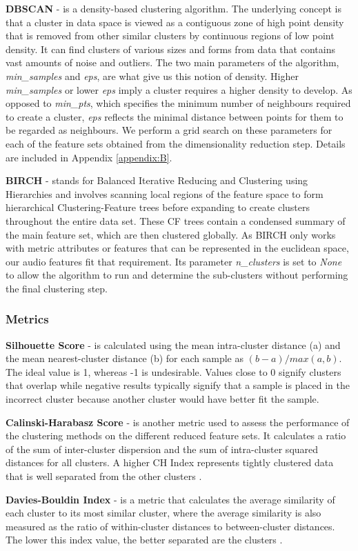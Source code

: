\setlength{\textfloatsep}{5pt}
\textbf{DBSCAN} - is a density-based clustering algorithm. The underlying concept is that a cluster in data space is viewed as a contiguous zone of high point density that is removed from other similar clusters by continuous regions of low point density. It can find clusters of various sizes and forms from data that contains vast amounts of noise and outliers. The two main parameters of the algorithm, \textit{min\_samples} and \textit{eps}, are what give us this notion of density. Higher \textit{min\_samples} or lower \textit{eps} imply a cluster requires a higher density to develop. As opposed to \textit{min\_pts}, which specifies the minimum number of neighbours required to create a cluster, \textit{eps} reflects the minimal distance between points for them to be regarded as neighbours. We perform a grid search on these parameters for each of the feature sets obtained from the dimensionality reduction step. Details are included in Appendix \ref{appendix:B}.

\textbf{BIRCH} - stands for Balanced Iterative Reducing and Clustering using Hierarchies and involves scanning local regions of the feature space to form hierarchical Clustering-Feature trees before expanding to create clusters throughout the entire data set. These CF trees contain a condensed summary of the main feature set, which are then clustered globally. As BIRCH only works with metric attributes or features that can be represented in the euclidean space, our audio features fit that requirement. Its parameter \textit{n\_clusters} is set to \textit{None} to allow the algorithm to run and determine the sub-clusters without performing the final clustering step.

\subsubsection{Metrics}
\textbf{Silhouette Score} - is calculated using the mean intra-cluster distance (a) and the mean nearest-cluster distance (b) for each sample as $(b-a)/max(a,b)$. The ideal value is 1, whereas -1 is undesirable. Values close to 0 signify clusters that overlap while negative results typically signify that a sample is placed in the incorrect cluster because another cluster would have better fit the sample.

\textbf{Calinski-Harabasz Score} - is another metric used to assess the performance of the clustering methods on the different reduced feature sets. It calculates a ratio of the sum of inter-cluster dispersion and the sum of intra-cluster squared distances for all clusters. A higher CH Index represents tightly clustered data that is well separated from the other clusters \cite{ch}.

\textbf{Davies-Bouldin Index} - is a metric that calculates the average similarity of each cluster to its most similar cluster, where the average similarity is also measured as the ratio of within-cluster distances to between-cluster distances. The lower this index value, the better separated are the clusters \cite{dbi}.
